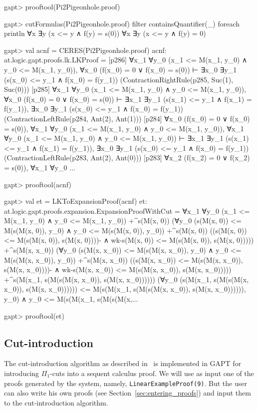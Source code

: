 \documentclass[a4paper,11pt]{article}
\begin{document}
\begin{clilisting}
gapt> prooftool(Pi2Pigeonhole.proof)

gapt> cutFormulas(Pi2Pigeonhole.proof) filter {containsQuantifier(_)} foreach println
∀x ∃y (x <= y ∧ f(y) = s(0))
∀x ∃y (x <= y ∧ f(y) = 0)

gapt> val acnf = CERES(Pi2Pigeonhole.proof)
acnf: at.logic.gapt.proofs.lk.LKProof =
[p286] ∀x_1 ∀y_0 (x_1 <= M(x_1, y_0) ∧ y_0 <= M(x_1, y_0)),
∀x_0 (f(x_0) = 0 ∨ f(x_0) = s(0))
⊢
∃x_0 ∃y_1 (s(x_0) <= y_1 ∧ f(x_0) = f(y_1))    (ContractionRightRule(p285, Suc(1), Suc(0)))
[p285] ∀x_1 ∀y_0 (x_1 <= M(x_1, y_0) ∧ y_0 <= M(x_1, y_0)),
∀x_0 (f(x_0) = 0 ∨ f(x_0) = s(0))
⊢
∃x_1 ∃y_1 (s(x_1) <= y_1 ∧ f(x_1) = f(y_1)),
∃x_0 ∃y_1 (s(x_0) <= y_1 ∧ f(x_0) = f(y_1))    (ContractionLeftRule(p284, Ant(2), Ant(1)))
[p284] ∀x_0 (f(x_0) = 0 ∨ f(x_0) = s(0)),
∀x_1 ∀y_0 (x_1 <= M(x_1, y_0) ∧ y_0 <= M(x_1, y_0)),
∀x_1 ∀y_0 (x_1 <= M(x_1, y_0) ∧ y_0 <= M(x_1, y_0))
⊢
∃x_1 ∃y_1 (s(x_1) <= y_1 ∧ f(x_1) = f(y_1)),
∃x_0 ∃y_1 (s(x_0) <= y_1 ∧ f(x_0) = f(y_1))    (ContractionLeftRule(p283, Ant(2), Ant(0)))
[p283] ∀x_2 (f(x_2) = 0 ∨ f(x_2) = s(0)),
∀x_1 ∀y_0 ...

gapt> prooftool(acnf)

gapt> val et = LKToExpansionProof(acnf)
et: at.logic.gapt.proofs.expansion.ExpansionProofWithCut =
∀x_1 ∀y_0 (x_1 <= M(x_1, y_0) ∧ y_0 <= M(x_1, y_0))
  +^{s(M(x, 0))}
    (∀y_0 (s(M(x, 0)) <= M(s(M(x, 0)), y_0) ∧ y_0 <= M(s(M(x, 0)), y_0))
      +^{s(M(x, 0))}
        ((s(M(x, 0)) <= M(s(M(x, 0)), s(M(x, 0))))- ∧
          wk-{s(M(x, 0)) <= M(s(M(x, 0)), s(M(x, 0)))}))
  +^{s(M(x, x_0))}
    (∀y_0 (s(M(x, x_0)) <= M(s(M(x, x_0)), y_0) ∧ y_0 <= M(s(M(x, x_0)), y_0))
      +^{s(M(x, x_0))}
        ((s(M(x, x_0)) <= M(s(M(x, x_0)), s(M(x, x_0))))- ∧
          wk-{s(M(x, x_0)) <= M(s(M(x, x_0)), s(M(x, x_0)))}))
  +^{s(M(x_1, s(M(s(M(x, x_0)), s(M(x, x_0))))))}
    (∀y_0
        (s(M(x_1, s(M(s(M(x, x_0)), s(M(x, x_0)))))) <=
            M(s(M(x_1, s(M(s(M(x, x_0)), s(M(x, x_0)))))), y_0) ∧
          y_0 <= M(s(M(x_1, s(M(s(M(x,...

gapt> prooftool(et)

\end{clilisting}

\subsection{Cut-introduction}\label{sec.cut-introduction}

The cut-introduction algorithm as described in~\cite{Hetzl2012,Hetzl14Algorithmic,Hetzl14Introducing} is
implemented in GAPT for introducing $\Pi_1$-cuts into a sequent calculus
proof. We will use as input one of the proofs generated by
the system, namely, \texttt{LinearExampleProof(9)}. But the user can also
write his own proofs (see Section~\ref{sec:entering_proofs})
and input them to the cut-introduction algorithm.
\end{document}
